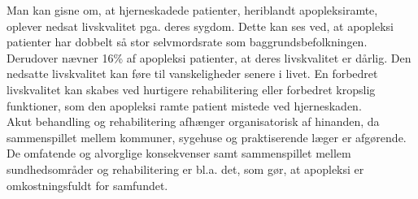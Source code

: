 Man kan gisne om, at hjerneskadede patienter, heriblandt apopleksiramte, oplever nedsat livskvalitet pga. deres sygdom. Dette kan ses ved, at apopleksi patienter har dobbelt så stor selvmordsrate som baggrundsbefolkningen. Derudover nævner 16\% af apopleksi patienter, at deres livskvalitet er dårlig\cite{Sundhedsstyrelsen2010}. Den nedsatte livskvalitet kan føre til vanskeligheder senere i livet. En forbedret livskvalitet kan skabes ved hurtigere rehabilitering eller forbedret kropslig funktioner, som den apopleksi ramte patient mistede ved hjerneskaden.\cite{Sundhedsstyrelsen2010} \\
Akut behandling og rehabilitering afhænger organisatorisk af hinanden, da sammenspillet mellem kommuner, sygehuse og praktiserende læger er afgørende. %
De omfatende og alvorglige konsekvenser samt sammenspillet mellem sundhedsområder og rehabilitering er bl.a. det, som gør, at apopleksi er omkostningsfuldt for samfundet.\cite{Sundhedsstyrelsen2010} \\
